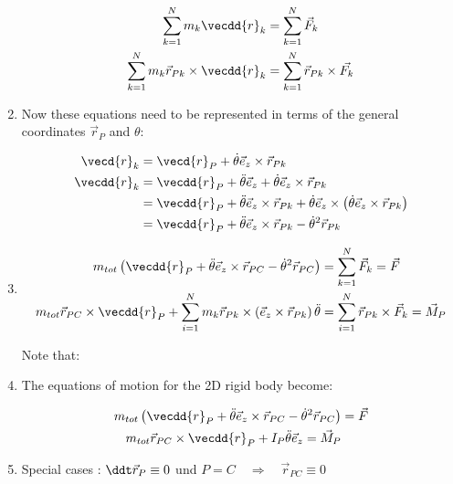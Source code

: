 \documentclass[10pt,a4paper]{scrartcl}
\begin{document}
\begin{multicols*}{2}
\begin{enumerate}
\begin{align*}
\sum\limits_{k=1}^Nm_k\vecdd{r}_k&=\sum\limits_{k=1}^N\vec{F}_k\\
\sum\limits_{k=1}^Nm_k\vec{r}_{Pk}\times\vecdd{r}_k&=\sum\limits_{k=1}^N\vec{r}_{Pk}\times\vec{F_k}
\end{align*}
\item Now these equations need to be represented in terms of the general coordinates $\vec{r}_P$ and $\theta$:

\begin{align*}
\vecd{r}_k&=\vecd{r}_P+\dot{\theta}\vec{e}_z\times\vec{r}_{Pk}\\
\vecdd{r}_k&=\vecdd{r}_P+\ddot{\theta}\vec{e}_z+\dot{\theta}\vec{e}_z\times\vec{r}_{Pk}\\
&=\vecdd{r}_P+\ddot{\theta}\vec{e}_z\times\vec{r}_{Pk}+\dot{\theta}\vec{e}_z\times\left(\dot{\theta}\vec{e}_z\times\vec{r}_{Pk}\right)\\
&=\vecdd{r}_P+\ddot{\theta}\vec{e}_z\times\vec{r}_{Pk}-\dot{\theta}^2\vec{r}_{Pk}
\end{align*}

\item 
\begin{align*}
m_{tot}\left(\vecdd{r}_P+\ddot{\theta}\vec{e}_z\times\vec{r}_{PC}-\dot{\theta}^2\vec{r}_{PC}\right)&=\sum\limits_{k=1}^N\vec{F}_k=\vec{F}\\
m_{tot}\vec{r}_{PC}\times\vecdd{r}_P+\sum\limits_{i=1}^Nm_k\vec{r}_{Pk}\times\left(\vec{e}_z\times\vec{r}_{Pk}\right)\ddot{\theta}&=\sum\limits_{i=1}^N\vec{r}_{Pk}\times\vec{F}_k=\vec{M}_P
\end{align*}

Note that:

\item The equations of motion for the 2D rigid body become:

\begin{align*}
m_{tot}\left(\vecdd{r}_P+\ddot{\theta}\vec{e}_z\times\vec{r}_{PC}-\dot{\theta}^2\vec{r}_{PC}\right)&=\vec{F}\\
m_{tot}\vec{r}_{PC}\times\vecdd{r}_P+I_P\ddot{\theta}\vec{e}_z=\vec{M}_P
\end{align*}

\item Special cases : $\ddt\vec{r}_P\equiv 0$ und $P=C\quad\Rightarrow\quad \vec{r}_{PC}\equiv 0$
\end{enumerate}


\end{multicols*}
\end{document}
